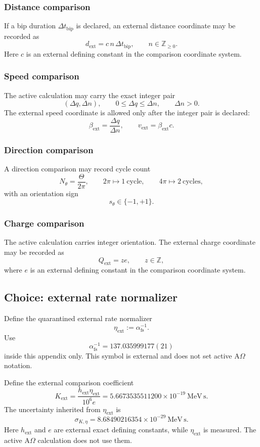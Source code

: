 \subsubsection{Distance comparison}
If a bip duration \(\Delta t_{\mathrm{bip}}\) is declared, an external distance coordinate may be recorded as
\[
d_{\mathrm{ext}}=c\,n\,\Delta t_{\mathrm{bip}},
\qquad n\in\mathbb Z_{\ge0}.
\]
Here \(c\) is an external defining constant in the comparison coordinate system.

\subsubsection{Speed comparison}
The active calculation may carry the exact integer pair
\[
(\Delta q,\Delta n),
\qquad
0\le \Delta q\le \Delta n,
\qquad
\Delta n>0.
\]
The external speed coordinate is allowed only after the integer pair is declared:
\[
\beta_{\mathrm{ext}}=\frac{\Delta q}{\Delta n},
\qquad
v_{\mathrm{ext}}=\beta_{\mathrm{ext}}c.
\]

\subsubsection{Direction comparison}
A direction comparison may record cycle count
\[
N_\theta=\frac{\Theta}{2\pi},
\qquad
2\pi\mapsto1\ \mathrm{cycle},
\qquad
4\pi\mapsto2\ \mathrm{cycles},
\]
with an orientation sign
\[
s_\theta\in\{-1,+1\}.
\]

\subsubsection{Charge comparison}
The active calculation carries integer orientation. The external charge coordinate may be recorded as
\[
Q_{\mathrm{ext}}=ze,
\qquad z\in\mathbb Z,
\]
where \(e\) is an external defining constant in the comparison coordinate system.

\subsection{Choice: external rate normalizer}\label{manual:external-comparison:action-normalization}
Define the quarantined external rate normalizer
\[
\eta_{\mathrm{ext}}:=\alpha_{\mathrm{fs}}^{-1}.
\]
Use
\[
\alpha_{\mathrm{fs}}^{-1}=137.035999177(21)
\]
inside this appendix only. This symbol is external and does not set active A\(\Omega\) notation.

Define the external comparison coefficient
\[
K_{\mathrm{ext}}
=
\frac{h_{\mathrm{ext}}\eta_{\mathrm{ext}}}{10^6e}
=
5.6673535511200\times10^{-19}\ \mathrm{MeV\,s}.
\]
The uncertainty inherited from \(\eta_{\mathrm{ext}}\) is
\[
\sigma_{K,\eta}
=
8.68490216354\times10^{-29}\ \mathrm{MeV\,s}.
\]
Here \(h_{\mathrm{ext}}\) and \(e\) are external exact defining constants, while \(\eta_{\mathrm{ext}}\) is measured. The active A\(\Omega\) calculation does not use them.


